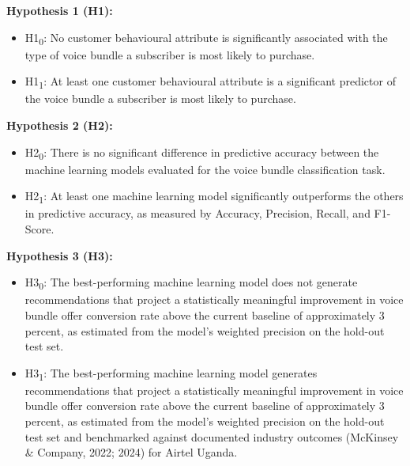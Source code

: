 \textbf{Hypothesis 1 (H1):}
\begin{itemize}
    \item H1\textsubscript{0}: No customer behavioural attribute is significantly associated with the type of voice bundle a subscriber is most likely to purchase.
    \item H1\textsubscript{1}: At least one customer behavioural attribute is a significant predictor of the voice bundle a subscriber is most likely to purchase.
\end{itemize}

\textbf{Hypothesis 2 (H2):}
\begin{itemize}
    \item H2\textsubscript{0}: There is no significant difference in predictive accuracy between the machine learning models evaluated for the voice bundle classification task.
    \item H2\textsubscript{1}: At least one machine learning model significantly outperforms the others in predictive accuracy, as measured by Accuracy, Precision, Recall, and F1-Score.
\end{itemize}

\textbf{Hypothesis 3 (H3):}
\begin{itemize}
    \item H3\textsubscript{0}: The best-performing machine learning model does not generate recommendations that project a statistically meaningful improvement in voice bundle offer conversion rate above the current baseline of approximately 3 percent, as estimated from the model's weighted precision on the hold-out test set.
    \item H3\textsubscript{1}: The best-performing machine learning model generates recommendations that project a statistically meaningful improvement in voice bundle offer conversion rate above the current baseline of approximately 3 percent, as estimated from the model's weighted precision on the hold-out test set and benchmarked against documented industry outcomes (McKinsey \& Company, 2022; 2024) for Airtel Uganda.
\end{itemize}
